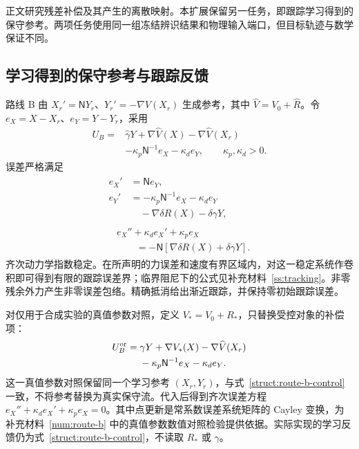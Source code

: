 正文研究残差补偿及其产生的离散映射。本扩展保留另一任务，即跟踪学习得到的保守参考。两项任务使用同一组冻结辨识结果和物理输入端口，但目标轨迹与数学保证不同。

\subsection{学习得到的保守参考与跟踪反馈}
\label{struct:route-b-section}

路线 B 由 $X_r'=\mathsf N Y_r$、$Y_r'=-\nabla\widehat V(X_r)$ 生成参考，其中 $\widehat V=V_0+\widehat R$。令 $e_X=X-X_r$、$e_Y=Y-Y_r$，采用
\begin{equation}\label{struct:route-b-control}
\begin{aligned}
 U_B={}&\widehat\gamma Y+\nabla\widehat V(X)
                     -\nabla\widehat V(X_r)\\
       &-\kappa_p\mathsf N^{-1}e_X-\kappa_de_Y,
       \qquad\kappa_p,\kappa_d>0.
\end{aligned}
\end{equation}
误差严格满足
\begin{equation}\label{struct:route-b-error}
\begin{gathered}
\begin{aligned}
 e_X'&=\mathsf N e_Y,\\
 e_Y'&=-\kappa_p\mathsf N^{-1}e_X-\kappa_de_Y
           \\&\quad-\nabla\delta R(X)-\delta\gamma Y,
\end{aligned}\\
\begin{aligned}
 &e_X''+\kappa_de_X'+\kappa_pe_X\\
 &\qquad=-\mathsf N[\nabla\delta R(X)+\delta\gamma Y].
\end{aligned}
\end{gathered}
\end{equation}
齐次动力学指数稳定。在所声明的力误差和速度有界区域内，对这一稳定系统作卷积即可得到有限的跟踪误差界；临界阻尼下的公式见补充材料~\ref{ss:tracking}。非零残余外力产生非零误差包络。精确抵消给出渐近跟踪，并保持零初始跟踪误差。

对仅用于合成实验的真值参数对照，定义 $V_*=V_0+R_*$，只替换受控对象的补偿项：
\begin{equation}\label{struct:route-b-oracle}
\begin{aligned}
 U_B^{\rm or}={}&\gamma Y+\nabla V_*(X)
                         -\nabla\widehat V(X_r)\\
              &-\kappa_p\mathsf N^{-1}e_X-\kappa_de_Y.
\end{aligned}
\end{equation}
这一真值参数对照保留同一个学习参考 $(X_r,Y_r)$，与式~\eqref{struct:route-b-control} 一致，不将参考替换为真实保守流。代入后得到齐次误差方程 $e_X''+\kappa_de_X'+\kappa_pe_X=0$。其中点更新是常系数误差系统矩阵的 Cayley 变换，为补充材料~\ref{num:route-b} 中的真值参数数值对照检验提供依据。实际实现的学习反馈仍为式~\eqref{struct:route-b-control}，不读取 $R_*$ 或 $\gamma$。

